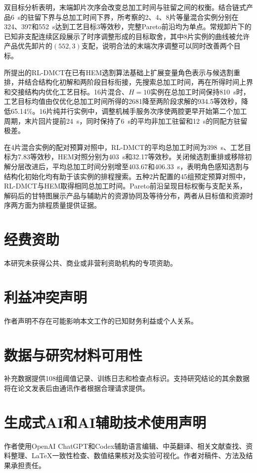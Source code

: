 \documentclass[preprint,12pt,nonatbib]{elsarticle}
\begin{document}
双目标分析表明，末端卸片次序会改变总加工时间与驻留之间的权衡。结合链式产品6~s的驻留下界与总加工时间下界，所考察的2、4、8片等量混合实例分别在324、397和552~s达到工艺目标3等效秒，完整Pareto前沿均为单点。常规卸片下的已知非支配连续区段展示了时序调整形成的目标取舍，其中8片实例的曲线被允许产品优先卸片的$(552,3)$支配，说明合法的末端次序调整可以同时改善两个目标。

所提出的RL-DMCT在已有HEM选割算法基础上扩展变量角色表示与候选割重排，并结合结构化初解和两阶段目标衔接，先搜索总加工时间，再在所得时间上界和交接结构内优化工艺目标。16片混合、$H=10$实例在总加工时间保持810~s时，工艺目标均值由仅优化总加工时间所得的2681降至两阶段求解的934.5等效秒，降低65.14\%。16片纯并行实例中，调整机械手服务次序使两腔更早开始第二个加工周期，末片回片提前24~s，同时保持了6~s的平均非加工驻留和12~s的同配方驻留极差。

在4片混合实例的配对预算对照中，RL-DMCT的平均总加工时间为398~s、工艺目标为7.83等效秒，HEM对照分别为403~s和32.17等效秒。关闭候选割重排或移除初解分层改进后，平均总加工时间分别增至403.67和406.33~s，表明角色感知选割与结构化初始化均有助于该实例的排程搜索。五种2片配置的45组预定预算对照中，RL-DMCT与HEM取得相同总加工时间。Pareto前沿呈现目标权衡与支配关系，解码后的甘特图展示产品与辅助片的资源协同及等待分布，两者从目标值和资源时序两方面为排程质量提供证据。

\section*{经费资助}
本研究未获得公共、商业或非营利资助机构的专项资助。

\section*{利益冲突声明}
作者声明不存在可能影响本文工作的已知财务利益或个人关系。

\section*{数据与研究材料可用性}
补充数据提供108组阈值记录、训练日志和检查点标识。支持研究结论的其余数据将在论文发表后由通讯作者根据合理请求提供。

\section*{生成式AI和AI辅助技术使用声明}
作者使用OpenAI ChatGPT和Codex辅助语言编辑、中英翻译、相关文献查找、资料整理、LaTeX一致性检查、数值结果核对及实验可视化。作者对稿件、方法及结果承担责任。

\FloatBarrier
\printbibliography[title={参考文献}]
\end{document}
